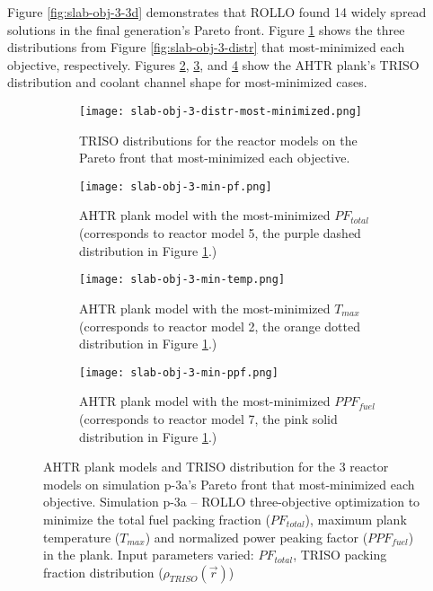 Figure \ref{fig:slab-obj-3-3d} demonstrates that \gls{ROLLO} found 14 widely spread 
solutions in the final generation's Pareto front.  
Figure \ref{fig:slab-obj-3-distr-most-minimized} shows the three distributions from 
Figure \ref{fig:slab-obj-3-distr} that most-minimized each objective, respectively. 
Figures \ref{fig:slab-obj-3-min-pf}, \ref{fig:slab-obj-3-min-temp}, and 
\ref{fig:slab-obj-3-min-ppf} show the \gls{AHTR} plank's TRISO distribution and 
coolant channel shape for most-minimized cases. 
\begin{figure}[htbp!]
    \centering
    \begin{subfigure}{0.85\textwidth}
        \texttt{[image: slab-obj-3-distr-most-minimized.png]}
        \caption{TRISO distributions for the reactor models on the Pareto front
        that most-minimized each objective.}
        \label{fig:slab-obj-3-distr-most-minimized}
    \end{subfigure}
    \begin{subfigure}{0.8\textwidth}
        \texttt{[image: slab-obj-3-min-pf.png]}
        \caption{\gls{AHTR} plank model with the most-minimized $PF_{total}$ 
        (corresponds to reactor model 5, the purple dashed distribution in 
        Figure \ref{fig:slab-obj-3-distr-most-minimized}.)}
        \label{fig:slab-obj-3-min-pf} 
    \end{subfigure}
    \begin{subfigure}{0.8\textwidth}
        \texttt{[image: slab-obj-3-min-temp.png]}
        \caption{\gls{AHTR} plank model with the most-minimized $T_{max}$
        (corresponds to reactor model 2, the orange dotted distribution in
        Figure \ref{fig:slab-obj-3-distr-most-minimized}.)}
        \label{fig:slab-obj-3-min-temp} 
    \end{subfigure}
    \begin{subfigure}{0.8\textwidth}
        \texttt{[image: slab-obj-3-min-ppf.png]}
        \caption{\gls{AHTR} plank model with the most-minimized $PPF_{fuel}$
        (corresponds to reactor model 7, the pink solid distribution in
        Figure \ref{fig:slab-obj-3-distr-most-minimized}.)}
        \label{fig:slab-obj-3-min-ppf} 
    \end{subfigure}
    \caption{AHTR plank models and TRISO distribution for the 3 reactor models on simulation 
    p-3a's Pareto front that most-minimized each objective.
    Simulation p-3a -- ROLLO three-objective optimization to minimize the total fuel 
    packing fraction ($PF_{total}$), maximum plank temperature ($T_{max}$) and 
    normalized power peaking factor ($PPF_{fuel}$) in the plank. 
    Input parameters varied: $PF_{total}$, TRISO packing fraction distribution
    ($\rho_{TRISO}(\vec{r})$)}
    \label{fig:slab-obj-3-most-minimized}
\end{figure}

